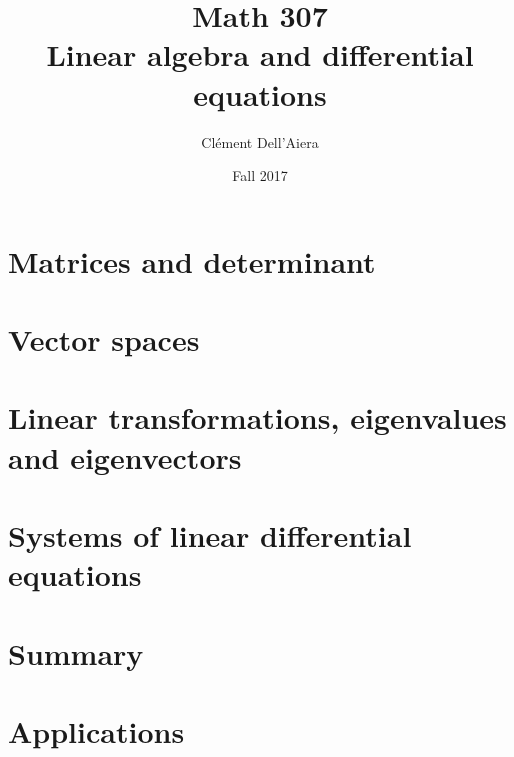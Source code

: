 \documentclass[a4paper,12pt]{book}
\title{Math 307 \\
\textbf{Linear algebra and differential equations}}
\date{Fall 2017}
\author{Clément Dell'Aiera}
\begin{document}
\maketitle

\pagestyle{plain}


\tableofcontents
\newpage

\pagestyle{fancy}
\chapter{Matrices and determinant}

\newpage

\newpage

\pagestyle{empty}


\chapter{Vector spaces}
\pagestyle{fancy}

\newpage


\chapter{Linear transformations, eigenvalues and eigenvectors}
\pagestyle{fancy}

\newpage


\chapter{Systems of linear differential equations}
\pagestyle{fancy}

\newpage
\pagestyle{empty}


\newpage
\pagestyle{empty}
%

\chapter{Summary}
\pagestyle{fancy}


\chapter{Applications}
\pagestyle{fancy}


%


 
\end{document}
